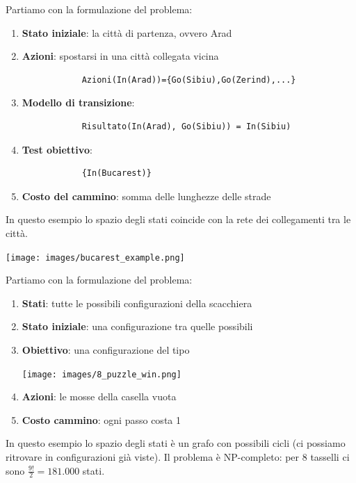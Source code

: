 \begin{example}
	Partiamo con la formulazione del problema:
	\begin{enumerate}
		\item \textbf{Stato iniziale}: la città di partenza, ovvero Arad
		\item \textbf{Azioni}: spostarsi in una città collegata vicina
		\begin{lstlisting}
			Azioni(In(Arad))={Go(Sibiu),Go(Zerind),...}
		\end{lstlisting}
		\item \textbf{Modello di transizione}: 
		\begin{lstlisting}
			Risultato(In(Arad), Go(Sibiu)) = In(Sibiu)
		\end{lstlisting}
		\item \textbf{Test obiettivo}:
		\begin{lstlisting}
			{In(Bucarest)}
		\end{lstlisting}
		\item \textbf{Costo del cammino}: somma delle lunghezze delle strade
	\end{enumerate}
	In questo esempio lo spazio degli stati coincide con la rete dei collegamenti tra le città.
	\begin{center}
		\texttt{[image: images/bucarest\_example.png]}
	\end{center}
\end{example}

\begin{example}
	Partiamo con la formulazione del problema:
	\begin{enumerate}
		\item \textbf{Stati}: tutte le possibili configurazioni della scacchiera
		\item \textbf{Stato iniziale}: una configurazione tra quelle possibili
		\item \textbf{Obiettivo}: una configurazione del tipo
		\begin{center}
			\texttt{[image: images/8\_puzzle\_win.png]}
		\end{center}
		\item \textbf{Azioni}: le mosse della casella vuota
		\item \textbf{Costo cammino}: ogni passo costa 1
	\end{enumerate}
	In questo esempio lo spazio degli stati è un grafo con possibili cicli (ci possiamo ritrovare in configurazioni già viste). Il problema è NP-completo: per 8 tasselli ci sono $\frac{9!}{2}=181.000$ stati.
\end{example}

